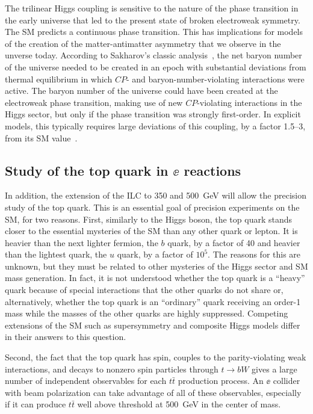 The trilinear Higgs coupling is sensitive to the nature of the phase
transition in the early universe that led to the present state of
broken electroweak symmetry.  
The  SM predicts a continuous phase transition.   This has
implications for models of the creation of the matter-antimatter
asymmetry that we observe in the unverse today. According to
Sakharov's classic analysis~\cite{Sakharov:1967dj}, the net baryon number of the universe
needed to be created in an epoch with substantial deviations from
thermal equilibrium in which $CP$- and baryon-number-violating
interactions were active.    The baryon number of the universe could
have been created at the electroweak phase transition, making use of new
$CP$-violating interactions in the Higgs sector, but only if the phase
transition was strongly first-order.   In explicit models, this
typically requires large deviations of this coupling, by a factor
1.5--3, from its SM value~\cite{Morrissey:2012db}.





\subsection{Study of the top quark in $\ee$ reactions}

In addition, the extension of the ILC to 350 and 500~GeV will allow the precision
study of the top quark.   This is an essential goal of precision
experiments on the SM, for two reasons.  First, similarly to the Higgs
boson, the top quark stands closer to the essential mysteries of the
SM than any other quark or lepton.   It is heavier than the next
lighter fermion, the $b$ quark, by a factor of 40 and heavier than the
lightest quark, the $u$ quark, by a factor of $10^5$.  The reasons for
this are unknown, but they must be related to other mysteries of the
Higgs sector and SM mass generation.  In fact, it is not understood
whether the top quark is a  ``heavy'' quark because of special
interactions that the other quarks do not share or, alternatively, whether the top
quark is an ``ordinary'' quark receiving an order-1 mass while the
masses of the other quarks are highly suppressed.  Competing extensions of the
SM such as supersymmetry and composite Higgs models differ in their
answers to this question.   

Second, the fact that the top quark has spin, couples to the
parity-violating weak interactions, and decays to nonzero spin
particles through  $t\to bW$ gives a large number of independent
observables for each $t\bar t$ production process. An $\ee$ collider
with beam polarization can take advantage of all of these observables,
especially if it can produce $t\bar t$ well above threshold at
500~GeV in the center of mass.  

